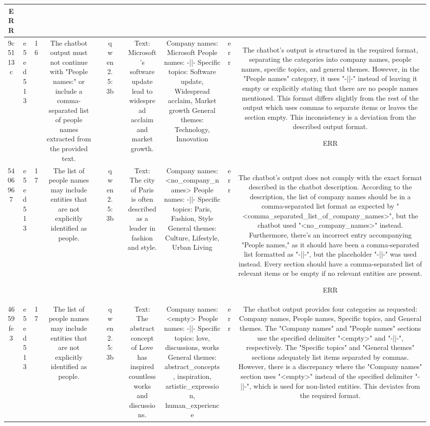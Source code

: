 \begin{table}[h!]
\begin{tabular}{|c|c|c|c|c|c|c|c|c|c|c|}
ERR\\
\hline
9c5113c & e5ed513 & 16 & The chatbot output must not continue with "People names:" or include a comma-separated list of people names extracted from the provided text. &  & qwen2.5:3b &  & Text: Microsoft's software update lead to widespread acclaim and market growth. & Company names: Microsoft
People names: -||-
Specific topics: Software update, Widespread acclaim, Market growth
General themes: Technology, Innovation & err & The chatbot's output is structured in the required format, separating the categories into company names, people names, specific topics, and general themes. However, in the "People names" category, it uses "-||-" instead of leaving it empty or explicitly stating that there are no people names mentioned. This format differs slightly from the rest of the output which uses commas to separate items or leaves the section empty. This inconsistency is a deviation from the described output format.

ERR\\
\hline
5406967 & e5ed513 & 17 & The list of people names may include entities that are not explicitly identified as people. &  & qwen2.5:3b &  & Text: The city of Paris is often described as a leader in fashion and style. & Company names: <no_company_names>
People names: -||-
Specific topics: Paris, Fashion, Style
General themes: Culture, Lifestyle, Urban Living & err & The chatbot's output does not comply with the exact format described in the chatbot description. According to the description, the list of company names should be in a comma-separated list format as expected by "<comma_separated_list_of_company_names>", but the chatbot used "<no_company_names>" instead. Furthermore, there's an incorrect entry accompanying "People names," as it should have been a comma-separated list formatted as "-||-", but the placeholder "-||-" was used instead. Every section should have a comma-separated list of relevant items or be empty if no relevant entities are present.

ERR\\
\hline
4659fe3 & e5ed513 & 17 & The list of people names may include entities that are not explicitly identified as people. &  & qwen2.5:3b &  & Text: The abstract concept of Love has inspired countless works and discussions. & Company names: <empty>
People names: -||-
Specific topics: love, discussions, works
General themes: abstract_concepts, inspiration, artistic_expression, human_experience & err & The chatbot output provides four categories as requested: Company names, People names, Specific topics, and General themes. The "Company names" and "People names" sections use the specified delimiter "<empty>" and "-||-", respectively. The "Specific topics" and "General themes" sections adequately list items separated by commas. However, there is a discrepancy where the "Company names" section uses "<empty>" instead of the specified delimiter "-||-", which is used for non-listed entities. This deviates from the required format.


\end{tabular}
\end{table}
